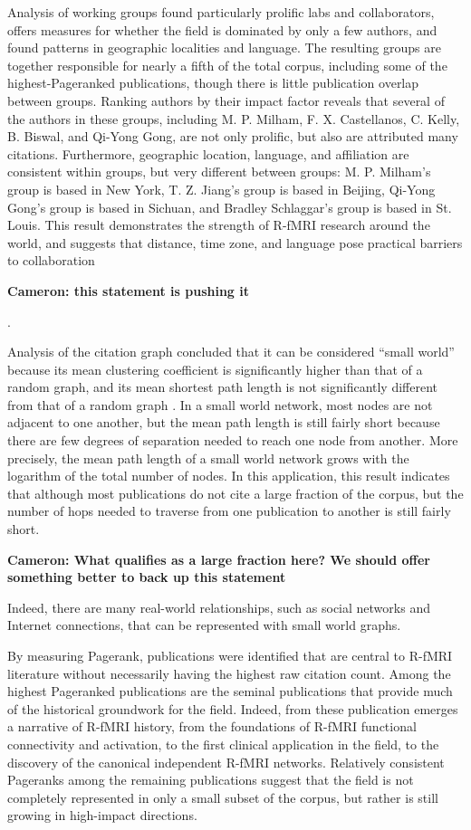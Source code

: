 \documentclass[5p]{elsarticle}
\newcommand\MyCBox[1]{%
  \colorbox{yellow!60}{\begin{varwidth}{\dimexpr\linewidth-2\fboxsep}#1\end{varwidth}}}
\newcommand{\COMMENTCC}[1]{\MyCBox{\textcolor{cc_commentcolor}{\textbf{Cameron:
#1}}}}
\begin{document}
Analysis of working groups found particularly prolific labs and collaborators,
offers measures for whether the field is dominated by only a few authors, and
found patterns in geographic localities and language. The resulting groups are
together responsible for nearly a fifth of the total corpus, including some of
the highest-Pageranked publications, though there is little publication overlap
between groups. Ranking authors by their impact factor reveals that several of
the authors in these groups, including M. P. Milham, F. X. Castellanos, C.
Kelly, B. Biswal, and Qi-Yong Gong, are not only prolific, but also are attributed many
citations. Furthermore, geographic location, language, and affiliation are
consistent within groups, but very different between groups: M. P. Milham’s group
is based in New York, T. Z. Jiang’s group is based in Beijing, Qi-Yong Gong’s
group is based in Sichuan, and Bradley Schlaggar’s group is based in St. Louis.
This result demonstrates the strength of R-fMRI research around the world, and
suggests that distance, time zone, and language pose practical barriers to
collaboration \COMMENTCC{this statement is pushing it}.

Analysis of the citation graph concluded that it can be considered ``small
world'' because its mean clustering coefficient is significantly higher than
that of a random graph, and its mean shortest path length is not significantly
different from that of a random graph \cite{Watts1998}. In a small world
network, most nodes are not adjacent to one another, but the mean path length is
still fairly short because there are few degrees of separation needed to reach
one node from another. More precisely, the mean path length of a small world
network grows with the logarithm of the total number of nodes. In this
application, this result indicates that although most publications do not cite a
large fraction of the corpus, but the number of hops needed to traverse from one
publication to another is still fairly short. \COMMENTCC{What qualifies as a
large fraction here? We should offer something better to back up this statement}
Indeed, there are many real-world relationships, such as social networks and
Internet connections, that can be represented with small world graphs. 

By measuring Pagerank, publications were identified that are central to R-fMRI
literature without necessarily having the highest raw citation count. Among the
highest Pageranked publications are the seminal publications that
provide much of the historical groundwork for the field. Indeed, from these
publication emerges a narrative of R-fMRI history, from the foundations of
R-fMRI functional connectivity and activation, to the first clinical application
in the field, to the discovery of the canonical independent R-fMRI networks.
Relatively consistent Pageranks among the remaining publications suggest that
the field is not completely represented in only a small subset of the corpus,
but rather is still growing in high-impact directions. 
\end{document}
